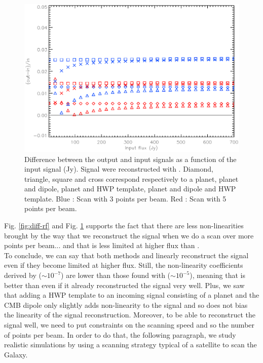 \begin{figure}[h]
\center
	\includegraphics[scale=0.5]{Figures/diff-planet-hwp-dipole-cf.eps}
	\caption{Difference between the output and input signals as a function of the input signal (Jy). Signal were reconstructed with \cf. Diamond, triangle, square and cross correspond respectively to a planet, planet and dipole, planet and HWP template, planet and dipole and HWP template. Blue : Scan with 3 points per beam. Red : Scan with 5 points per beam.}
	\label{fig:diff-cf}
\end{figure}

Fig. \ref{fig:diff-rf} and Fig. \ref{fig:diff-cf} supports the fact that there are less non-linearities brought by the way that we reconstruct the signal when we do a scan over more points per beam... and that \cf is less limited at higher flux than \rf.\\ 

To conclude, we can say that both methods \rf and \cf linearly reconstruct the signal even if they become limited at higher flux. Still, the non-linearity coefficients derived by \cf ($\sim 10^{-7}$) are lower than those found with \rf ($\sim 10^{-5}$), meaning that \cf is better than \rf even if it already reconstructed the signal very well.
Plus, we saw that adding a HWP template to an incoming signal consisting of a planet and the CMB dipole only slightly adds non-linearity to the signal and so does not bias the linearity of the signal reconstruction. Moreover, to be able to reconstruct the signal well, we need to put constraints on the scanning speed and so the number of points per beam. In order to do that, the following paragraph,  we study realistic simulations by using a scanning strategy typical of a satellite to scan the Galaxy.



